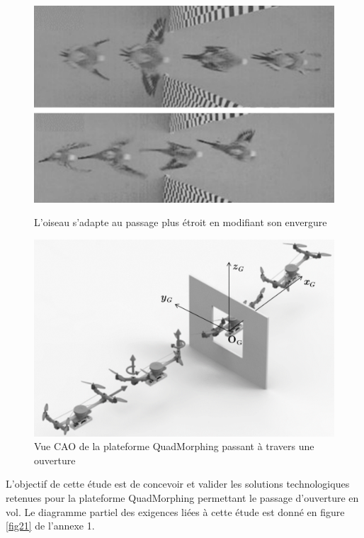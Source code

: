 \begin{figure}[ht!]
\begin{minipage}[t]{0.49\linewidth}
\begin{center}
 \includegraphics[width=0.95\linewidth]{img/fig01}
\end{center}
\caption{\label{fig01} L'oiseau s'adapte au passage plus étroit en modifiant son envergure}
\end{minipage}\hfill
\begin{minipage}[t]{0.49\linewidth}
\begin{center}
 \includegraphics[width=0.95\linewidth]{img/fig02}
\end{center}
\caption{\label{fig02} Vue CAO de la plateforme QuadMorphing passant à travers une ouverture}
\end{minipage}
\end{figure}

L'objectif de cette étude est de concevoir et valider les solutions technologiques retenues pour la plateforme QuadMorphing permettant le passage d'ouverture en vol. Le diagramme partiel des exigences liées à cette étude est donné en figure \ref{fig21} de l'annexe 1.


